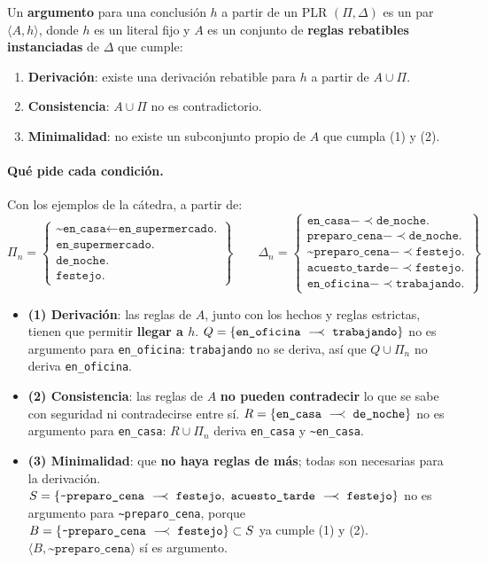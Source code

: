 \documentclass[11pt,a4paper]{article}
\newcommand{\nf}{\textasciitilde}                 %
\newcommand{\reb}{\mathrel{-\!\!\!\prec}}         %
\newcommand{\est}{\leftarrow}                      %
\newcommand{\regla}[3]{\text{\texttt{#1}}~\ensuremath{#2}~\text{\texttt{#3}}}
\begin{document}
Un \textbf{argumento} para una conclusión $h$ a partir de un PLR $(\Pi, \Delta)$ es un par $\langle A, h\rangle$, donde $h$ es un literal fijo y $A$ es un conjunto de \textbf{reglas rebatibles instanciadas} de $\Delta$ que cumple:
\begin{enumerate}
  \item \textbf{Derivación}: existe una derivación rebatible para $h$ a partir de $A \cup \Pi$.
  \item \textbf{Consistencia}: $A \cup \Pi$ no es contradictorio.
  \item \textbf{Minimalidad}: no existe un subconjunto propio de $A$ que cumpla (1) y (2).
\end{enumerate}

\paragraph{Qué pide cada condición.} Con los ejemplos de la cátedra, a partir de:
\[
\Pi_n = \left\{\begin{array}{l}
\texttt{\nf en\_casa} \est \texttt{en\_supermercado.} \\
\texttt{en\_supermercado.} \\
\texttt{de\_noche.} \\
\texttt{festejo.}
\end{array}\right\}
\qquad
\Delta_n = \left\{\begin{array}{l}
\texttt{en\_casa} \reb \texttt{de\_noche.} \\
\texttt{preparo\_cena} \reb \texttt{de\_noche.} \\
\texttt{\nf preparo\_cena} \reb \texttt{festejo.} \\
\texttt{acuesto\_tarde} \reb \texttt{festejo.} \\
\texttt{en\_oficina} \reb \texttt{trabajando.}
\end{array}\right\}
\]
\begin{itemize}
  \item \textbf{(1) Derivación}: las reglas de $A$, junto con los hechos y reglas estrictas, tienen que permitir \textbf{llegar a $h$}. $Q = \{\regla{en\_oficina}{\reb}{trabajando}\}$ no es argumento para \texttt{en\_oficina}: \texttt{trabajando} no se deriva, así que $Q \cup \Pi_n$ no deriva \texttt{en\_oficina}.
  \item \textbf{(2) Consistencia}: las reglas de $A$ \textbf{no pueden contradecir} lo que se sabe con seguridad ni contradecirse entre sí. $R = \{\regla{en\_casa}{\reb}{de\_noche}\}$ no es argumento para \texttt{en\_casa}: $R \cup \Pi_n$ deriva \texttt{en\_casa} y \texttt{\nf en\_casa}.
  \item \textbf{(3) Minimalidad}: que \textbf{no haya reglas de más}; todas son necesarias para la derivación. $S = \{\regla{\nf preparo\_cena}{\reb}{festejo},\ \regla{acuesto\_tarde}{\reb}{festejo}\}$ no es argumento para \texttt{\nf preparo\_cena}, porque $B = \{\regla{\nf preparo\_cena}{\reb}{festejo}\} \subset S$ ya cumple (1) y (2). $\langle B, \texttt{\nf preparo\_cena}\rangle$ sí es argumento.
\end{itemize}
\end{document}

